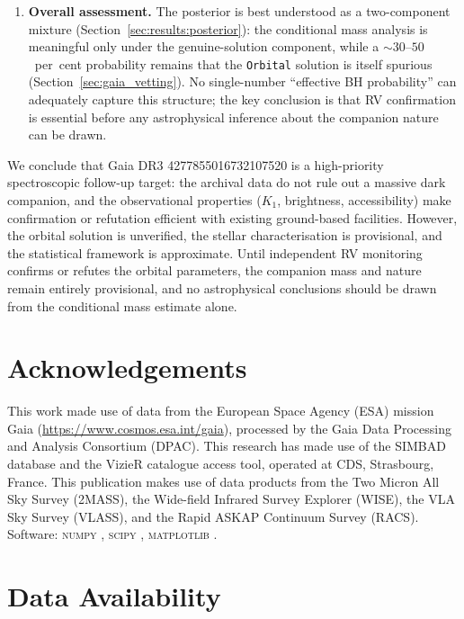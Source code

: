 \documentclass[usenatbib,fleqn]{mnras}
\begin{document}
\begin{enumerate}
\item \textbf{Overall assessment.}
  The posterior is best understood as a two-component mixture
  (Section~\ref{sec:results:posterior}): the conditional mass analysis
  is meaningful only under the genuine-solution component, while
  a $\sim 30$--$50$~per~cent probability remains that the
  \texttt{Orbital} solution is itself spurious
  (Section~\ref{sec:gaia_vetting}).  No single-number
  ``effective BH probability'' can adequately capture this
  structure; the key conclusion is that RV confirmation is
  essential before any astrophysical inference about the
  companion nature can be drawn.
\end{enumerate}

We conclude that Gaia DR3 4277855016732107520 is a
high-priority spectroscopic follow-up target: the archival data
do not rule out a massive dark companion, and
the observational properties ($K_1$, brightness, accessibility)
make confirmation or refutation efficient with existing
ground-based facilities.  However, the orbital solution is
unverified, the stellar characterisation is provisional, and
the statistical framework is approximate.  Until independent
RV monitoring confirms or refutes the orbital parameters, the
companion mass and nature remain entirely provisional, and no
astrophysical conclusions should be drawn from the conditional
mass estimate alone.

\section*{Acknowledgements}

This work made use of data from the European Space Agency (ESA)
mission Gaia (\url{https://www.cosmos.esa.int/gaia}), processed by
the Gaia Data Processing and Analysis Consortium (DPAC).
This research has made use of the SIMBAD database and the VizieR
catalogue access tool, operated at CDS, Strasbourg, France.
This publication makes use of data products from the Two Micron All
Sky Survey (2MASS), the Wide-field Infrared Survey Explorer
(WISE), the VLA Sky Survey (VLASS), and the Rapid ASKAP Continuum
Survey (RACS).
Software: \textsc{numpy} \citep{Harris2020},
\textsc{scipy} \citep{Virtanen2020},
\textsc{matplotlib} \citep{Hunter2007}.

\section*{Data Availability}
\end{document}

